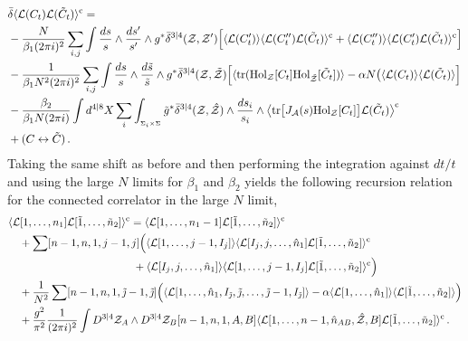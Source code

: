 \documentclass[12pt]{article}
\def \tr {\mathop{\rm tr}\nolimits}
\numberwithin{equation}{section}
\begin{document}
\begin{align}
&\bar{\delta} \langle \mathcal{L}(C_t) \mathcal{L}(\tilde{C}_t)\rangle^{\rm c} = \notag \\
&-\frac{N}{\beta_1 (2 \pi i)^2} \sum_{i,j} \int  \frac{ds}{s} \wedge\frac{ds'}{s'} \wedge g^* \bar{\delta}^{3|4}(\mathcal{Z},\mathcal{Z'})
\Bigl[ \langle \mathcal{L}(C^\prime_t) \rangle \langle \mathcal{L}(C^{\prime \prime}_t) \mathcal{L}(\tilde{C}_t)\rangle^{\rm c} + \langle \mathcal{L}(C^{\prime \prime}_t) \rangle \langle \mathcal{L}(C^{\prime}_t) \mathcal{L}(\tilde{C}_t)\rangle^{\rm c}  \Bigr] \notag \\
&-\frac{1}{\beta_1 N^2 (2 \pi i)^2} \sum_{i,j} \int  \frac{ds}{s} \wedge\frac{d\tilde{s}}{\tilde{s}} \wedge g^* \bar{\delta}^{3|4}(\mathcal{Z},\tilde{\mathcal{Z}})
\Bigl[ \langle \tr ({\rm Hol}_{\mathcal{Z}}[C_t] {\rm Hol}_{\tilde{\mathcal{Z}}}[\tilde{C}_t])\rangle  - \alpha N \bigl(\langle \mathcal{L}(C_t) \rangle \langle \mathcal{L}(\tilde{C}_t)\rangle  \Bigr] \notag \\
&-\frac{\beta_2}{\beta_1 N (2 \pi i)} \int d^{4|8}X \sum_i \int_{{}_{\Sigma_i \times \Sigma}} \tilde{g}^* \bar{\delta}^{3|4}(\mathcal{Z},\hat{\mathcal{Z}}) \wedge \frac{ds_i}{s_i} \wedge \big\langle \! \tr \bigl[ J_{\mathcal{A}}(s) {\rm Hol}_{\mathcal{Z}}[C_t] \bigr] \mathcal{L}(\tilde{C}_t)\big\rangle^{\rm c}  \notag \\
&+ (C \leftrightarrow \tilde{C}) \,.
\end{align}
Taking the same shift as before and then performing the integration against $dt/t$ and using the large $N$ limits for $\beta_1$ and $\beta_2$ yields the following recursion relation for the connected correlator in the large $N$ limit,
\begin{align}
    &\langle \mathcal{L}[1,\ldots,n_1] \mathcal{L}[\tilde{1},\ldots,\tilde{n}_2]\rangle^{\rm c} = \langle \mathcal{L}[1,\ldots,n_1-1] \mathcal{L}[\tilde{1},\ldots,\tilde{n}_2]\rangle^{\rm c}  \notag \\
    &\quad + \sum [n-1,n,1,j-1,j] \Bigl(\langle \mathcal{L}[1,\ldots,j-1,I_j]\rangle \langle \mathcal{L}[I_j,j,\ldots,\hat{n}_1] \mathcal{L}[\tilde{1},\ldots,\tilde{n}_2]\rangle^{\rm c}  \notag \\
    &  \qquad \qquad \qquad \qquad \qquad \quad \,\,\, +\langle \mathcal{L}[I_j,j,\ldots,\hat{n}_1] \rangle \langle \mathcal{L}[1,\ldots,j-1,I_j] \mathcal{L}[\tilde{1},\ldots,\tilde{n}_2]\rangle^{\rm c} \Bigr) \notag \\
    & \quad+\frac{1}{N^2} \sum [n-1,n,1,\tilde{\jmath}-1,\tilde{\jmath}] \Bigl( \langle \mathcal{L}[1,\ldots,\hat{n}_1,I_{\tilde{\jmath}},\tilde{\jmath},\ldots,\tilde{\jmath}-1,I_{\tilde{\jmath}}]\rangle - \alpha \langle \mathcal{L}[1,\ldots,\hat{n}_1] \rangle \langle \mathcal{L}[\tilde{1},\ldots,\tilde{n}_2]\rangle\Bigr)  \notag \\
    &\quad +\frac{g^2}{\pi^2} \frac{1}{(2 \pi i)^2} \int D^{3|4}\mathcal{Z}_A \wedge D^{3|4}\mathcal{Z}_B [n-1,n,1,A,B] \langle \mathcal{L}[1,\ldots,n-1,\hat{n}_{AB},\hat{\mathcal{Z}},B] \mathcal{L}[\tilde{1},\ldots,\tilde{n}_2]\rangle^{\rm c} \, .
    \label{looprecursion}
\end{align}
\end{document}
